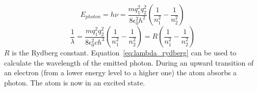 \documentclass[12pt,a4paper]{article}
\numberwithin{equation}{section}
\numberwithin{figure}{section}
\numberwithin{table}{section}
\begin{document}

\begin{equation}
E_{photon} = h \nu = \frac{m q_{1}^2 q_{2}^2}{8 \epsilon_{0}^2 h^2}\left( \frac{1}{n_{1}^2} - \frac{1}{n_{2}^2} \right) \label{eq:E_photon2}
\end{equation}
\begin{equation}
\frac{1}{\lambda} = \frac{m q_{1}^2 q_{2}^2}{8 \epsilon_{0}^2 c h^3} \left( \frac{1}{n_{1}^2} - \frac{1}{n_{2}^2} \right) = R \left( \frac{1}{n_{1}^2} - \frac{1}{n_{2}^2} \right) \label{eq:lambda_rydberg}
\end{equation}
$R$ is the Rydberg constant. Equation~\ref{eq:lambda_rydberg} can be used to calculate the wavelength of the emitted photon. During an upward transition of an electron (from a lower energy level to a higher one) the atom absorbs a photon. The atom is now in an excited state.
\end{document}
